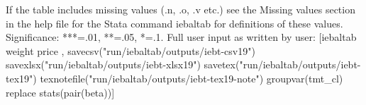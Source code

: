 If the table includes missing values (.n, .o, .v etc.) see the Missing values section in the help file for the Stata command iebaltab for definitions of these values. Significance: ***=.01, **=.05, *=.1. Full user input as written by user: [iebaltab weight price , savecsv("run/iebaltab/outputs/iebt-csv19") savexlsx("run/iebaltab/outputs/iebt-xlsx19") savetex("run/iebaltab/outputs/iebt-tex19") texnotefile("run/iebaltab/outputs/iebt-tex19-note") groupvar(tmt\_cl) replace stats(pair(beta))] 
